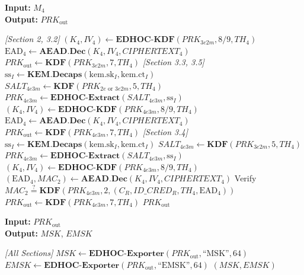 \documentclass{easychair}
\begin{document}
\begin{algorithm}[H]
\caption{Step 5 (\emph{Initiator}) --- Memproses $M_4$ (opsional untuk Section~2 dan~3.2; wajib untuk lainnya)}
\label{alg:step5}
\textbf{Input:} $M_4$ \\
\textbf{Output:} $PRK_{\mathrm{out}}$
\begin{algorithmic}[1]
\Statex \textit{[Section 2, 3.2]} 
\State $(K_4, IV_4) \gets \mathbf{EDHOC\text{-}KDF}(PRK_{3e2m}, 8\text{/}9, TH_4)$
\State $\mathrm{EAD}_4 \gets \mathbf{AEAD.Dec}(K_4, IV_4, CIPHERTEXT_4)$
\State $PRK_{\mathrm{out}} \gets \mathbf{KDF}(PRK_{3e2m}, 7, TH_4)$
\Statex \textit{[Section 3.3, 3.5]} 
\State $\mathrm{ss}_I \gets \mathbf{KEM.Decaps}(\mathrm{kem.sk}_I, \mathrm{kem.ct}_I)$
\State $SALT_{4e3m} \gets \mathbf{KDF}(PRK_{2e\text{ or }3e2m}, 5, TH_4)$ 
\State $PRK_{4e3m} \gets \mathbf{EDHOC\text{-}Extract}(SALT_{4e3m}, \mathrm{ss}_I)$
\State $(K_4, IV_4) \gets \mathbf{EDHOC\text{-}KDF}(PRK_{4e3m}, 8\text{/}9, TH_4)$
\State $\mathrm{EAD}_4 \gets \mathbf{AEAD.Dec}(K_4, IV_4, CIPHERTEXT_4)$
\State $PRK_{\mathrm{out}} \gets \mathbf{KDF}(PRK_{4e3m}, 7, TH_4)$
\Statex \textit{[Section 3.4]} 
\State $\mathrm{ss}_I \gets \mathbf{KEM.Decaps}(\mathrm{kem.sk}_I, \mathrm{kem.ct}_I)$
\State $SALT_{4e3m} \gets \mathbf{KDF}(PRK_{3e2m}, 5, TH_4)$
\State $PRK_{4e3m} \gets \mathbf{EDHOC\text{-}Extract}(SALT_{4e3m}, \mathrm{ss}_I)$
\State $(K_4, IV_4) \gets \mathbf{EDHOC\text{-}KDF}(PRK_{4e3m}, 8\text{/}9, TH_4)$
\State $(\mathrm{EAD}_4, MAC_2) \gets \mathbf{AEAD.Dec}(K_4, IV_4, CIPHERTEXT_4)$
\State Verify $MAC_2 \stackrel{?}{=} \mathbf{KDF}(PRK_{4e3m}, 2, (C_R, ID\_CRED_R, TH_4, \mathrm{EAD}_4))$
\State $PRK_{\mathrm{out}} \gets \mathbf{KDF}(PRK_{4e3m}, 7, TH_4)$
\State \Return $PRK_{\mathrm{out}}$
\end{algorithmic}
\end{algorithm}


\begin{algorithm}[H]
\caption{Step 6 --- Derivasi Kunci Akhir (Kedua Pihak)}
\label{alg:step6}
\textbf{Input:} $PRK_{\mathrm{out}}$ \\
\textbf{Output:} $MSK$, $EMSK$
\begin{algorithmic}[1]
\Statex \textit{[All Sections]}
\State $MSK \gets \mathbf{EDHOC\text{-}Exporter}(PRK_{\mathrm{out}}, \text{``MSK''}, 64)$
\State $EMSK \gets \mathbf{EDHOC\text{-}Exporter}(PRK_{\mathrm{out}}, \text{``EMSK''}, 64)$
\State \Return $(MSK, EMSK)$
\end{algorithmic}
\end{algorithm}
\end{document}
